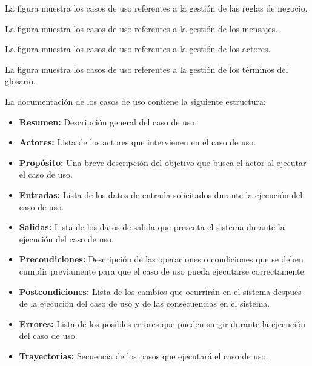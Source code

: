 \clearpage
La figura  muestra los casos de uso referentes a la gestión de las reglas de negocio.\\


\clearpage
La figura  muestra los casos de uso referentes a la gestión de los mensajes.\\


\clearpage
La figura  muestra los casos de uso referentes a la gestión de los actores.\\


\clearpage
La figura  muestra los casos de uso referentes a la gestión de los términos del glosario.\\




\clearpage
La documentación de los casos de uso contiene la siguiente estructura:
 
    \begin{itemize}
	\item {\bf Resumen:} Descripción general del caso de uso.
	\item {\bf Actores:} Lista de los actores que intervienen en el caso de uso.
	\item {\bf Propósito:} Una breve descripción del objetivo que busca el actor al ejecutar el caso de uso.
	\item {\bf Entradas:} Lista de los datos de entrada solicitados durante la ejecución del caso de uso.
	\item {\bf Salidas:} Lista de los datos de salida que presenta el sistema durante la ejecución del caso de uso.
	\item {\bf Precondiciones:} Descripción de las operaciones o condiciones que se deben cumplir previamente para que el caso de uso pueda ejecutarse correctamente.
	\item {\bf Postcondiciones:} Lista de los cambios que ocurrirán en el sistema después de la ejecución del caso de uso y de las consecuencias en el sistema.
	\item {\bf Errores:} Lista de los posibles errores que pueden surgir durante la ejecución del caso de uso.
	\item {\bf Trayectorias:} Secuencia de los pasos que ejecutará el caso de uso.
    \end{itemize}
    